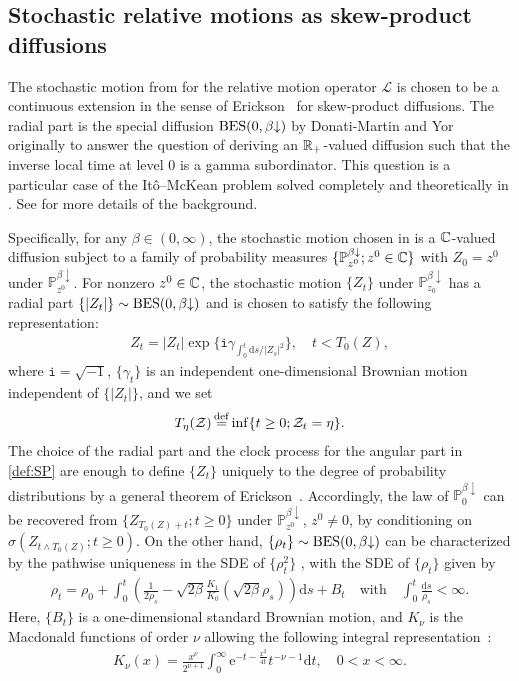 \documentclass[12pt, twoside]{article}
\numberwithin{figure}{section}
\newcommand{\BES}{{\rm BES}}
\newcommand{\e}{{\mathrm e}}
\newcommand{\1}{\mathds 1}
\newcommand{\da}{{\downarrow}}
\newcommand{\ms}{\mathscr}
\renewcommand{\P}{{\mathbb P}}
\newcommand{\mc}{\mathcal}
\renewcommand{\d}{{\mathrm d}}
\newcommand{\R}{{\Bbb R}}
\newcommand{\2}{{\mathbf 1}}
\renewcommand{\i}{{\mathtt i}}
\newcommand{\defeq}{{\stackrel{\rm def}{=}}}
\begin{document}
\subsection{Stochastic relative motions as skew-product diffusions}
\label{sec:intro-rm}
The stochastic motion from \cite{C:BES} for the relative motion operator $\ms L$ is chosen to be a continuous extension in the sense of Erickson~\cite{Erickson} for 
skew-product diffusions. The radial part is the special diffusion $\BES(0,\beta\da)$ by Donati-Martin and Yor~\cite{DY:Krein}
originally to answer the question of deriving an $\R_+$-valued diffusion such that the inverse local time at level $0$ is a gamma subordinator. This question is a particular case of the It\^{o}--McKean problem solved completely and theoretically in \cite{Knight:Krein,KW:Krein}. See \cite[Section~2]{C:BES} for more details of the background. 

Specifically, for any $\beta\in (0,\infty)$, the stochastic motion chosen in \cite{C:BES} is a $\Bbb C$-valued diffusion subject to a family of probability measures $\{\P^{\beta\da}_{z^0};z^0\in \Bbb C\}$ with $Z_0=z^0$ under $\P^{\beta\da}_{z^0}$. For nonzero $z^0\in \Bbb C$, the stochastic motion $\{Z_t\}$ under $\P^{\beta\da}_{z_0}$ has a radial part $\{|Z_t|\}\sim \BES(0,\beta\da)$ and is chosen to satisfy the following representation: 
\begin{align}\label{def:SP}
Z_t=|Z_t|\exp \big\{\i\gamma_{\int_0^t \d s/|Z_s|^2}\big\},\quad t<T_0(Z),
\end{align}
where $\i=\sqrt{-1}$, $\{\gamma_t\}$ is an independent one-dimensional Brownian motion independent of $\{|Z_t|\}$, and we set
\begin{align}\label{def:TetaZ}
T_\eta(\mc Z)\,\defeq \inf\{t\geq0; \mc Z_t=\eta\}.
\end{align}
The choice of the radial part and the clock process for the angular part in \eqref{def:SP} are enough to define $\{Z_t\}$ uniquely to the degree of probability distributions by a general theorem of Erickson~\cite[Theorem~1]{Erickson}. Accordingly, the law of $\P^{\beta\da}_0$ can be recovered from $\{Z_{T_0(Z)+t};t\geq 0\}$ under $\P^{\beta\da}_{z^0}$, $z^0\neq 0$, by conditioning on $\sigma(Z_{t\wedge T_0(Z)};t\geq 0)$. On the other hand, $\{\rho_t\}\sim\BES(0,\beta\da)$ can be characterized by the pathwise uniqueness in the SDE of $\{\rho^2_t\}$ \cite[Theorem~2.15]{C:BES}, with the SDE of $\{\rho_t\}$ given by 
\begin{align}\label{eq:BESb}
\rho_t=\rho_0+\int_0^t \left(\frac{1}{2\rho_s}-\sqrt{2\beta}\frac{K_1}{K_0}(\sqrt{2\beta}\rho_s)\right)\d s+B_t\quad \mbox{with}\quad\int_0^t \frac{\d s}{\rho_s}<\infty.
\end{align}
Here, $\{B_t\}$  is a one-dimensional standard Brownian motion, and $K_\nu$ is the Macdonald functions of order $\nu$ allowing the following integral representation~\cite[(5.10.25), p.119]{Lebedev}: 
\begin{align}\label{def:K}
K_\nu(x)=\frac{x^\nu}{2^{\nu+1}}\int_0^\infty \e^{-t-\frac{x^2}{4t}}t^{-\nu-1}\d t,\quad 0<x<\infty.
\end{align}
\end{document}
